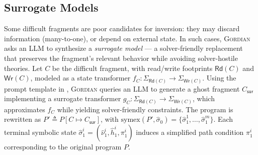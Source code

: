 \documentclass[acmsmall]{acmart}
\newcommand{\projName}{\textsc{Gordian}\xspace}
\theoremstyle{definition}
\begin{document}
\subsection{Surrogate Models}
\label{sec:surrogate-models}

Some difficult fragments are poor candidates for inversion: they may discard information (many-to-one), or depend on external state. In such cases, \projName asks an LLM to synthesize a \emph{surrogate model} --- a solver-friendly replacement that preserves the fragment's relevant behavior while avoiding solver-hostile theories.
Let \(C\) be the difficult fragment, with read/write footprints
\(\mathsf{Rd}(C)\) and \(\mathsf{Wr}(C)\), modeled as a state transformer
\(f_C:\Sigma_{\mathsf{Rd}(C)} \to \Sigma_{\mathsf{Wr}(C)}\).
Using the prompt template in , \projName{} queries an
LLM to generate a ghost fragment \(C_{\mathsf{sur}}\) implementing a surrogate
transformer \(g_C:\Sigma_{\mathsf{Rd}(C)} \to \Sigma_{\mathsf{Wr}(C)}\), which
approximates \(f_C\) while yielding solver-friendly constraints.
The program is rewritten as \(P' \triangleq P[C \mapsto C_{\mathsf{sur}}]\), with
\(\mathrm{symex}(P',\hat\sigma_0)=\{\hat\sigma_1^1,\ldots,\hat\sigma_1^m\}\).
Each terminal symbolic state
\(\hat\sigma_1^i=(\hat\nu_1^i,\hat h_1^i,\pi_1^i)\) induces a simplified path
condition \(\pi_1^i\) corresponding to the original program \(P\).
\end{document}
